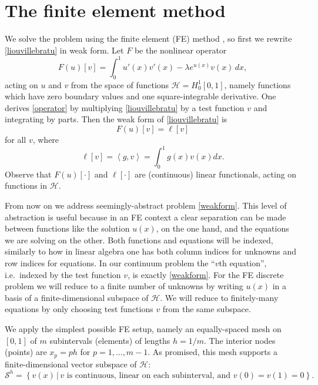 \documentclass[letterpaper,final,12pt,reqno]{amsart}
\newcommand{\ip}[2]{\left<#1,#2\right>}
\begin{document}
\section{The finite element method}

We solve the problem using the finite element (FE) method \cite{Bueler2021,Elmanetal2014}, so first we rewrite \eqref{liouvillebratu} in weak form.  Let $F$ be the nonlinear operator
\begin{equation}
  F(u)[v] = \int_0^1 u'(x) v'(x) - \lambda e^{u(x)} v(x)\, dx,  \label{operator}
\end{equation}
acting on $u$ and $v$ from the space of functions $\mathcal{H}=H_0^1[0,1]$, namely functions which have zero boundary values and one square-integrable derivative.  One derives \eqref{operator} by multiplying \eqref{liouvillebratu} by a test function $v$ and integrating by parts.  Then the weak form of \eqref{liouvillebratu} is
\begin{equation}
  F(u)[v] = \ell[v] \label{weakform}
\end{equation}
for all $v$, where
\begin{equation}
  \ell[v] = \ip{g}{v} = \int_0^1 g(x) v(x) dx.  \label{rhsfunctional}
\end{equation}
Observe that $F(u)[\cdot]$ and $\ell[\cdot]$ are (continuous) linear functionals, acting on functions in $\mathcal{H}$.

From now on we address seemingly-abstract problem \eqref{weakform}.  This level of abstraction is useful because in an FE context a clear separation can be made between functions like the solution $u(x)$, on the one hand, and the equations we are solving on the other.  Both functions and equations will be indexed, similarly to how in linear algebra one has both column indices for unknowns and row indices for equations.  In our continuum problem the ``$v$th equation'', i.e.~indexed by the test function $v$, is exactly \eqref{weakform}.  For the FE discrete problem we will reduce to a finite number of unknowns by writing $u(x)$ in a basis of a finite-dimensional subspace of $\mathcal{H}$.  We will reduce to finitely-many equations by only choosing test functions $v$ from the same subspace.

We apply the simplest possible FE setup, namely an equally-spaced mesh on $[0,1]$ of $m$ subintervals (elements) of lengths $h=1/m$.  The interior nodes (points) are $x_p=ph$ for $p=1,\dots,m-1$.  As promised, this mesh supports a finite-dimensional vector subspace of $\mathcal{H}$:
\begin{equation}
\mathcal{S}^h = \left\{v(x)\,\big|\,v \text{ is continuous, linear on each subinterval, and } v(0)=v(1)=0\right\}.  \label{fespace}
\end{equation}
\end{document}
